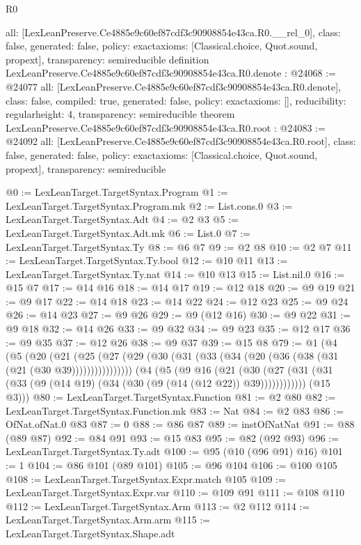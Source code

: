 \begin{lexlean}{R0}
\begin{coremodule}
{  all: [LexLeanPreserve.Ce4885e9c60ef87cdf3c90908854e43ca.R0.__rel_0],
  class: false,
  generated: false,
  policy: exact{axioms: [Classical.choice, Quot.sound, propext]},
  transparency: semireducible
}
definition LexLeanPreserve.Ce4885e9c60ef87cdf3c90908854e43ca.R0.denote : @24068 := @24077 {
  all: [LexLeanPreserve.Ce4885e9c60ef87cdf3c90908854e43ca.R0.denote],
  class: false,
  compiled: true,
  generated: false,
  policy: exact{axioms: []},
  reducibility: regular{height: 4},
  transparency: semireducible
}
theorem LexLeanPreserve.Ce4885e9c60ef87cdf3c90908854e43ca.R0.root : @24083 := @24092 {
  all: [LexLeanPreserve.Ce4885e9c60ef87cdf3c90908854e43ca.R0.root],
  class: false,
  generated: false,
  policy: exact{axioms: [Classical.choice, Quot.sound, propext]},
  transparency: semireducible
}

@0 := LexLeanTarget.TargetSyntax.Program
@1 := LexLeanTarget.TargetSyntax.Program.mk
@2 := List.cons.{0}
@3 := LexLeanTarget.TargetSyntax.Adt
@4 := @2 @3
@5 := LexLeanTarget.TargetSyntax.Adt.mk
@6 := List.{0}
@7 := LexLeanTarget.TargetSyntax.Ty
@8 := @6 @7
@9 := @2 @8
@10 := @2 @7
@11 := LexLeanTarget.TargetSyntax.Ty.bool
@12 := @10 @11
@13 := LexLeanTarget.TargetSyntax.Ty.nat
@14 := @10 @13
@15 := List.nil.{0}
@16 := @15 @7
@17 := @14 @16
@18 := @14 @17
@19 := @12 @18
@20 := @9 @19
@21 := @9 @17
@22 := @14 @18
@23 := @14 @22
@24 := @12 @23
@25 := @9 @24
@26 := @14 @23
@27 := @9 @26
@29 := @9 (@12 @16)
@30 := @9 @22
@31 := @9 @18
@32 := @14 @26
@33 := @9 @32
@34 := @9 @23
@35 := @12 @17
@36 := @9 @35
@37 := @12 @26
@38 := @9 @37
@39 := @15 @8
@79 := @1
    (@4
      (@5
        (@20
          (@21 (@25 (@27 (@29 (@30 (@31 (@33 (@34 (@20 (@36 (@38 (@31 (@21 (@30 @39))))))))))))))))
      (@4
        (@5
          (@9
            @16
            (@21
              (@30 (@27 (@31 (@31 (@33 (@9 (@14 @19) (@34 (@30 (@9 (@14 (@12 @22)) @39))))))))))))
        (@15 @3)))
@80 := LexLeanTarget.TargetSyntax.Function
@81 := @2 @80
@82 := LexLeanTarget.TargetSyntax.Function.mk
@83 := Nat
@84 := @2 @83
@86 := OfNat.ofNat.{0} @83
@87 := 0
@88 := @86 @87
@89 := instOfNatNat
@91 := @88 (@89 @87)
@92 := @84 @91
@93 := @15 @83
@95 := @82 (@92 @93)
@96 := LexLeanTarget.TargetSyntax.Ty.adt
@100 := @95 (@10 (@96 @91) @16)
@101 := 1
@104 := @86 @101 (@89 @101)
@105 := @96 @104
@106 := @100 @105
@108 := LexLeanTarget.TargetSyntax.Expr.match @105
@109 := LexLeanTarget.TargetSyntax.Expr.var
@110 := @109 @91
@111 := @108 @110
@112 := LexLeanTarget.TargetSyntax.Arm
@113 := @2 @112
@114 := LexLeanTarget.TargetSyntax.Arm.arm
@115 := LexLeanTarget.TargetSyntax.Shape.adt

\end{coremodule}
\end{lexlean}
